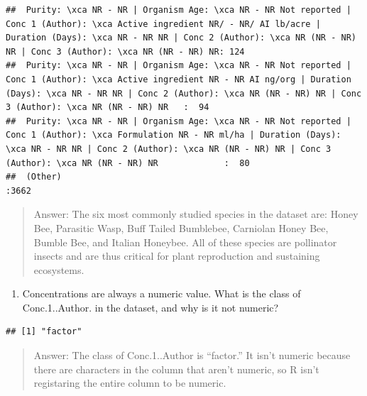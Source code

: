 \documentclass[]{article}
\newenvironment{Shaded}{\begin{snugshade}}{\end{snugshade}}
\newcommand{\KeywordTok}[1]{\textcolor[rgb]{0.13,0.29,0.53}{\textbf{#1}}}
\newcommand{\DecValTok}[1]{\textcolor[rgb]{0.00,0.00,0.81}{#1}}
\newcommand{\OperatorTok}[1]{\textcolor[rgb]{0.81,0.36,0.00}{\textbf{#1}}}
\newcommand{\NormalTok}[1]{#1}
\providecommand{\tightlist}{%
  \setlength{\itemsep}{0pt}\setlength{\parskip}{0pt}}
\begin{document}
\begin{verbatim}
##  Purity: \xca NR - NR | Organism Age: \xca NR - NR Not reported | Conc 1 (Author): \xca Active ingredient NR/ - NR/ AI lb/acre | Duration (Days): \xca NR - NR NR | Conc 2 (Author): \xca NR (NR - NR) NR | Conc 3 (Author): \xca NR (NR - NR) NR: 124  
##  Purity: \xca NR - NR | Organism Age: \xca NR - NR Not reported | Conc 1 (Author): \xca Active ingredient NR - NR AI ng/org | Duration (Days): \xca NR - NR NR | Conc 2 (Author): \xca NR (NR - NR) NR | Conc 3 (Author): \xca NR (NR - NR) NR   :  94  
##  Purity: \xca NR - NR | Organism Age: \xca NR - NR Not reported | Conc 1 (Author): \xca Formulation NR - NR ml/ha | Duration (Days): \xca NR - NR NR | Conc 2 (Author): \xca NR (NR - NR) NR | Conc 3 (Author): \xca NR (NR - NR) NR             :  80  
##  (Other)                                                                                                                                                                                                                                         :3662
\end{verbatim}

\begin{quote}
Answer: The six most commonly studied species in the dataset are: Honey
Bee, Parasitic Wasp, Buff Tailed Bumblebee, Carniolan Honey Bee, Bumble
Bee, and Italian Honeybee. All of these species are pollinator insects
and are thus critical for plant reproduction and sustaining ecosystems.
\end{quote}

\begin{enumerate}
\def\labelenumi{\arabic{enumi}.}
\setcounter{enumi}{7}
\tightlist
\item
  Concentrations are always a numeric value. What is the class of
  Conc.1..Author. in the dataset, and why is it not numeric?
\end{enumerate}

\begin{Shaded}
\end{Shaded}

\begin{verbatim}
## [1] "factor"
\end{verbatim}

\begin{quote}
Answer: The class of Conc.1..Author is ``factor.'' It isn't numeric
because there are characters in the column that aren't numeric, so R
isn't registaring the entire column to be numeric.
\end{quote}
\end{document}
